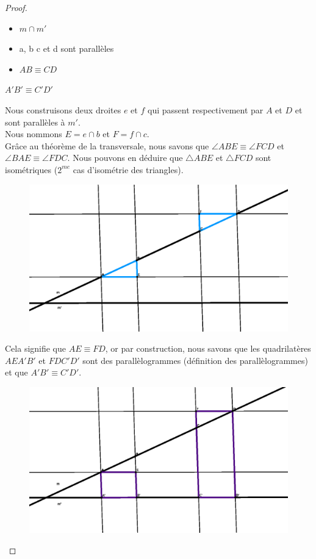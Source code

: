 \documentclass[a4paper,12pt]{article}
\begin{document}
\begin{proof}
\begin{hyp}
\begin{itemize}
    \item $m \cap m'$
    \item a, b c et d sont parallèles
    \item $AB \equiv CD$
\end{itemize}
\end{hyp}
\begin{concl}
$A'B' \equiv C'D'$
\end{concl}
Nous construisons deux droites $e$ et $f$ qui passent respectivement par $A$ et $D$ et sont parallèles à $m'$.\\
Nous nommons $E = e \cap b$ et $F = f \cap c$.\\
Grâce au théorème de la transversale, nous savons que $\angle ABE \equiv \angle FCD$ et $\angle BAE \equiv \angle FDC$. Nous pouvons en déduire que $\triangle ABE$ et $\triangle FCD$ sont isométriques ($2^{me}$ cas d'isométrie des triangles).\\
\begin{figure}[H]
        \centering
        \includegraphics[scale=0.9]{semblable2-2.eps}
    \end{figure}

Cela signifie que $AE \equiv FD$, or par construction, nous savons que  les quadrilatères $AEA'B'$ et $FDC'D'$ sont des parallèlogrammes (définition des parallèlogrammes) et que $A'B' \equiv C'D'$.
\begin{figure}[H]
        \centering
        \includegraphics[scale=0.9]{semblable2-3.eps}
    \end{figure}
    
\end{proof}
\end{document}
